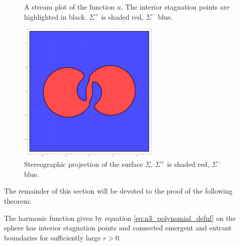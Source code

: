 \begin{example}
\begin{figure}
    \caption{A stream plot of the function $u$. The interior stagnation points are highlighted in black.
    $\Sigma^+$ is shaded red, $\Sigma^-$ blue.}
    \label{pl:n3_hf_inflowOutflowStagnationPoint_overview}
  \end{figure}
  \begin{figure}
    \centering
    \includegraphics[width=0.6\textwidth]{../plots/n3_hf_inflowOutflow_Ball_Surface.pdf}
    \caption{Stereographic projection of the surface $\Sigma$. $\Sigma^+$ is shaded red, $\Sigma^-$ blue.}
    \label{pl:n3_hf_inflowOutflowStagnationPoint_Surface}
  \end{figure}
\end{example}

The remainder of this section will be devoted to the proof of the following theorem:
\begin{theorem}\label{th:n3_polynomial_connectedInflowOutflow}
  The harmonic function given by equation \eqref{eq:n3_polynomial_defnf} on the sphere
  has interior stagnation points and connected emergent and entrant
  boundaries for sufficiently large $r>0$.
\end{theorem}

